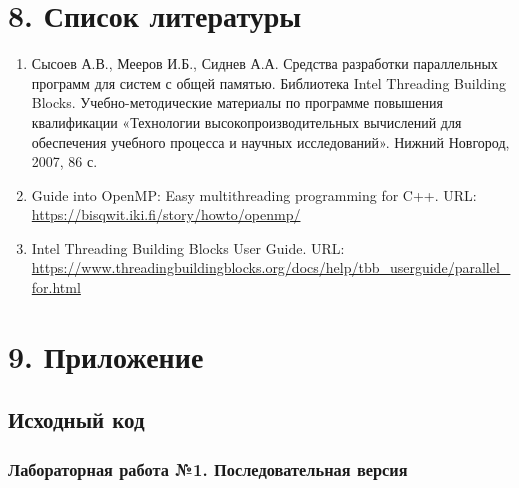 \documentclass{report}
\begin{document}
    \newpage
    \section*{8. Список литературы}
    \begin{enumerate}
        \item Сысоев А.В., Мееров И.Б., Сиднев А.А. Средства разработки параллельных программ для систем с общей памятью. Библиотека Intel Threading Building Blocks. Учебно-методические материалы по программе повышения квалификации «Технологии высокопроизводительных вычислений для обеспечения учебного процесса и научных исследований». Нижний Новгород, 2007, 86 с.
        \item Guide into OpenMP: Easy multithreading programming for C++. URL: \url{https://bisqwit.iki.fi/story/howto/openmp/}
        \item Intel Threading Building Blocks User Guide. URL: \url{https://www.threadingbuildingblocks.org/docs/help/tbb_userguide/parallel_for.html}
    \end{enumerate}

    \newpage
    \section*{9. Приложение}

    \subsection*{Исходный код}

    \subsubsection*{Лабораторная работа №1. Последовательная версия}
    
    
    
\end{document}
